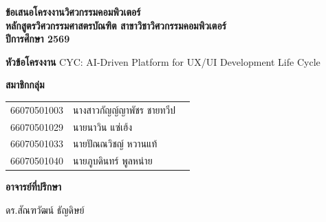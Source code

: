 \documentclass[a4paper,oneside]{cpe-thesis-th}
\def\thaidisstitleone{CYC: AI-Driven Platform for UX/UI Development Life Cycle}
\def\thaidissauthorone{นางสาวกัญญ์ญาพัชร ชายทวีป}
\def\dissstudentidone{66070501003}
\def\thaidissauthortwo{นายนาวิน แซ่เฮ้ง}
\def\dissstudentidtwo{66070501029}
\def\thaidissauthorthree{นายปัณณวิชญ์ หวานแท้}
\def\dissstudentidthree{66070501033}
\def\thaidissauthorfour{นายภูบดินทร์ พูลหน่าย}
\def\dissstudentidfour{66070501040}
\def\thaidissadvisor{ดร.สัณฑวัฒน์ ธัญดิษย์}
\begin{document}


\begin{titlepage}
  \thispagestyle{empty}
  \setlength{\parindent}{0pt}
  \setlength{\parskip}{0pt}
  \fontsize{14}{18}\selectfont

  \begin{center}
    \textbf{ข้อเสนอโครงงานวิศวกรรมคอมพิวเตอร์}\\[4pt]
    \textbf{หลักสูตรวิศวกรรมศาสตรบัณฑิต สาขาวิชาวิศวกรรมคอมพิวเตอร์}\\[4pt]
    \textbf{ปีการศึกษา 2569}
  \end{center}
  \vspace{9mm}

  \textbf{หัวข้อโครงงาน} \thaidisstitleone
  \vspace{5mm}

  \textbf{สมาชิกกลุ่ม}\par
  \begingroup
    \fontsize{14}{18}\selectfont
    \setlength{\tabcolsep}{3pt}
    \renewcommand{\arraystretch}{1}
    \begin{tabularx}{\textwidth}{@{}r>{\RaggedRight\arraybackslash}Xl@{}}
      \hspace*{12mm}\dissstudentidone & \thaidissauthorone \\
      \dissstudentidtwo & \thaidissauthortwo \\
      \dissstudentidthree & \thaidissauthorthree \\
      \dissstudentidfour & \thaidissauthorfour \\
    \end{tabularx}
  \endgroup
  \par\vspace{5mm}

  \textbf{อาจารย์ที่ปรึกษา}\par
  \hspace*{12mm} \thaidissadvisor\par
  \vspace{5mm}


\end{titlepage}
\end{document}
